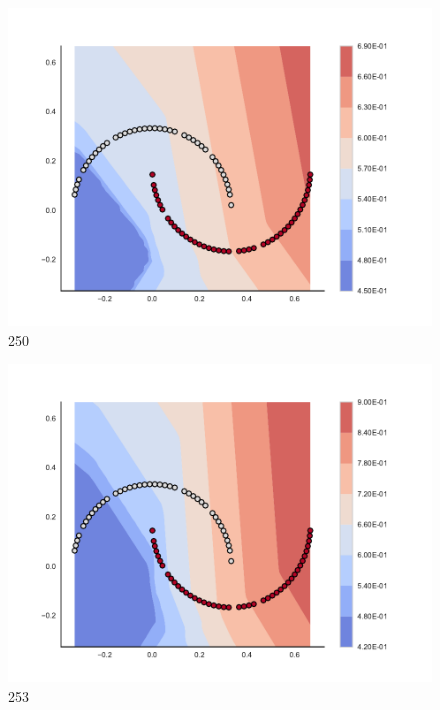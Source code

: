 \begin{subfigure}[b]{0.09\textwidth}
    \includegraphics[clip, trim=2.35cm 1.75cm 4.5cm 0cm,width=\textwidth]{img/convergence/250.pdf}
    \caption{250}
    \label{fig:convergence_250}
\end{subfigure}
%
\begin{subfigure}[b]{0.09\textwidth}
    \includegraphics[clip, trim=2.35cm 1.75cm 4.5cm 0cm,width=\textwidth]{img/convergence/253.pdf}
    \caption{253}
    \label{fig:convergence_253}
\end{subfigure}
%
